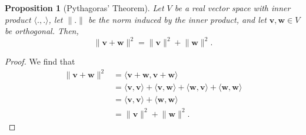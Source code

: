 \documentclass[a4paper, openany]{memoir}
\theoremstyle{definition}
\theoremstyle{plain}
\newtheorem{proposition}[definition]{Proposition}
\begin{document}
\begin{proposition}[Pythagoras' Theorem]
    Let $V$ be a real vector space with inner product $\langle ., . \rangle$, let $\lVert . \rVert$ be the norm induced by the inner product, and let $\bm{v}, \bm{w} \in V$ be orthogonal. Then,
    \[\lVert \bm{v} + \bm{w} \rVert^2 = \lVert \bm{v} \rVert^2 + \lVert \bm{w} \rVert^2.\]
\end{proposition}
\begin{proof}
    We find that
    \begin{align*}
        \lVert \bm{v} + \bm{w} \rVert^2 &= \langle \bm{v} + \bm{w}, \bm{v} + \bm{w} \rangle \\
        &= \langle \bm{v}, \bm{v} \rangle + \langle \bm{v}, \bm{w} \rangle + \langle \bm{w}, \bm{v} \rangle + \langle \bm{w}, \bm{w} \rangle \\
        &= \langle \bm{v}, \bm{v} \rangle + \langle \bm{w}, \bm{w} \rangle \\
        &= \lVert \bm{v} \rVert^2 + \lVert \bm{w} \rVert^2.
    \end{align*}
\end{proof}
\end{document}
